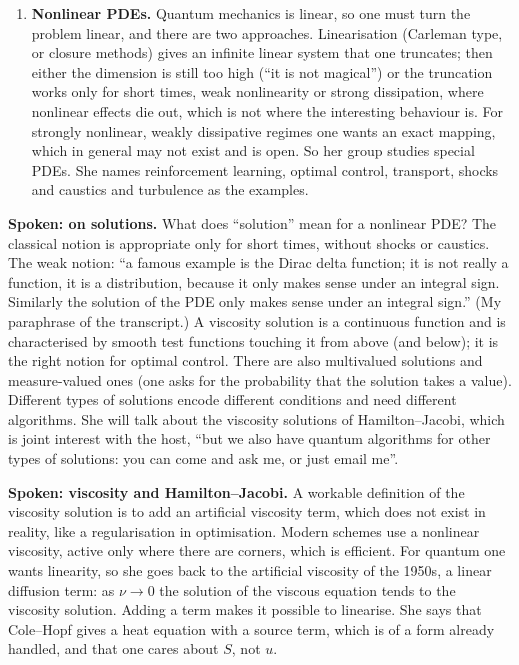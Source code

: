 \begin{enumerate}
\item {\bf Nonlinear PDEs.} Quantum mechanics
is linear, so one must turn the problem
linear, and there are two approaches.
Linearisation (Carleman type, or closure
methods) gives an infinite linear system that
one truncates; then either the dimension is
still too high (``it is not magical'') or the
truncation works only for short times, weak
nonlinearity or strong dissipation, where
nonlinear effects die out, which is not where
the interesting behaviour is. For strongly
nonlinear, weakly dissipative regimes one
wants an exact mapping, which in general may
not exist and is open. So her group studies
special PDEs. She names reinforcement
learning, optimal control, transport, shocks
and caustics and turbulence as the examples.
\end{enumerate}

\medskip\noindent
{\bf Spoken: on solutions.}
What does ``solution'' mean for a nonlinear PDE?
The classical notion is appropriate only for
short times, without shocks or caustics. The
weak notion: ``a famous example is the Dirac
delta function; it is not really a function, it
is a distribution, because it only makes sense
under an integral sign. Similarly the
solution of the PDE only makes sense under an
integral sign.'' (My paraphrase of the
transcript.) A viscosity solution is a
continuous function and is characterised by
smooth test functions touching it from above
(and below); it is the right notion for
optimal control. There are also multivalued
solutions and measure-valued ones (one asks for
the probability that the solution takes a
value). Different types of solutions encode
different conditions and need different
algorithms. She will talk about the viscosity
solutions of Hamilton--Jacobi, which is joint
interest with the host, ``but we also have
quantum algorithms for other types of
solutions: you can come and ask me, or just
email me''.

\medskip\noindent
{\bf Spoken: viscosity and Hamilton--Jacobi.}
A workable definition of the viscosity solution
is to add an artificial viscosity term, which
does not exist in reality, like a
regularisation in optimisation. Modern schemes
use a nonlinear viscosity, active only where
there are corners, which is efficient. For
quantum one wants linearity, so she goes back
to the artificial viscosity of the 1950s, a
linear diffusion term: as $\nu\to0$ the
solution of the viscous equation tends to the
viscosity solution. Adding a term makes it
possible to linearise. She says that Cole--Hopf
gives a heat equation with a source term, which
is of a form already handled, and that one
cares about $S$, not $u$.

